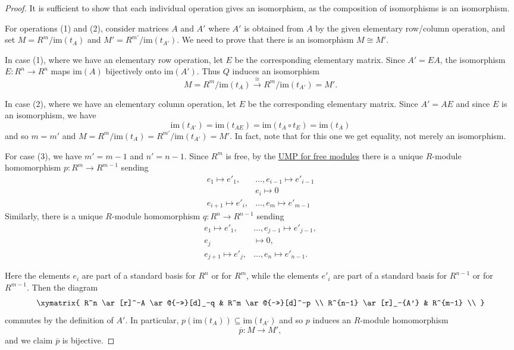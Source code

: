\documentclass[12pt]{report}
\numberwithin{equation}{section}
\numberwithin{theorem}{chapter}
\theoremstyle{definition}
\newtheorem*{basic properties}{Basic Properties}
\newtheorem*{Important Remark}{Important Remark}
\begin{document}
 
 

\begin{proof}
It is sufficient to show that each individual operation gives an isomorphism, as the composition of isomorphisms is an isomorphism.

For operations (1) and (2), consider matrices $A$ and $A'$ where $A'$ is obtained from $A$ by the given elementary row/column operation, and set $M = R^m/\mathrm{im}(t_A)$ and $M' = R^{m'}/\mathrm{im}(t_{A'})$. We need to prove that there is an isomorphism $M \cong M'$.

In case (1), where we have an elementary row operation, let $E$ be the corresponding elementary matrix. Since $A' = E A$, the isomorphism $E: R^n \to R^n$ maps $\mathrm{im}(A)$ bijectively onto $\mathrm{im}(A')$. Thus $Q$ induces an isomorphism
$$M = R^m/\mathrm{im}(t_A) \xrightarrow{\cong} R^m/\mathrm{im}(t_{A'}) = M'.$$

In case (2), where we have an elementary column operation, let $E$ be the corresponding elementary matrix. Since $A'=AE$ and since $E$ is an isomorphism, we have 
$$\mathrm{im}(t_{A'}) = \mathrm{im}(t_{AE})=\mathrm{im}(t_A\circ t_E)=\mathrm{im}(t_A)$$ 
and so $m=m'$ and $M = R^m/\mathrm{im}(t_A) = R^{m'}/\mathrm{im}(t_{A'}) = M'$. In fact, note that for this one we get equality, not merely an isomorphism.

For case (3), we have $m'=m-1$ and $n'=n-1$. 
Since $R^m$ is free, by the \hyperref[UMPfreemod]{UMP for free modules} there is a unique $R$-module homomorphism
$p\!: R^{m} \to R^{m-1}$ sending 
$$\begin{aligned}
e_1 \mapsto e'_1, & \ldots, e_{i-1} \mapsto e'_{i-1}\\
& e_i \mapsto 0\\
e_{i+1} \mapsto e'_{i}, & \ldots, e_{m} \mapsto e'_{m-1}
\end{aligned}$$
Similarly, there is a unique $R$-module homomorphism $q\!: R^{n} \to R^{n-1}$ sending 
$$\begin{aligned}
	e_1 \mapsto e'_1, &\ldots, e_{j-1} \mapsto e'_{j-1}, \\
	e_j &\mapsto 0, \\
	e_{j+1} \mapsto e'_{j}, &\ldots, e_n \mapsto e'_{n-1}.
\end{aligned}$$

Here the elements $e_i$ are part of a standard basis for $R^n$ or for $R^m$, while the elements $e'_i$ are part of a standard basis for $R^{n-1}$ or for $R^{m-1}$.
Then the diagram
$$\xymatrix{
R^n \ar[r]^-A \ar@{->>}[d]_-q & R^m \ar@{->>}[d]^-p \\
R^{n-1} \ar[r]_-{A'}  & R^{m-1} \\
}$$
commutes by the definition of $A'$. In particular, $p(\mathrm{im}(t_A)) \subseteq \mathrm{im}(t_{A'})$ and so $p$ induces an $R$-module  homomorphism
$$\overline{p}\!: M \to M',$$
and we claim $\overline{p}$ is bijective.


\end{proof}
\end{document}
